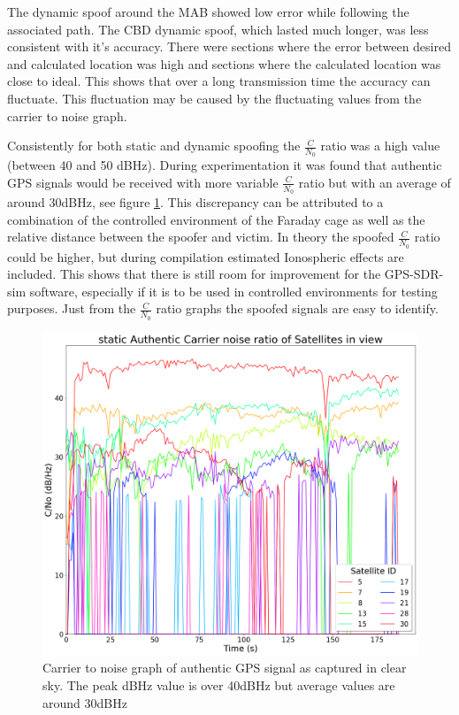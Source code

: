 The dynamic spoof around the MAB showed low error while following the associated path. The CBD dynamic spoof, which lasted much longer, was less consistent with it's
accuracy. There were sections where the error between desired and calculated location was high and sections where the calculated location was close to ideal. This shows that over a long
transmission time the accuracy can fluctuate. This fluctuation may be caused by the fluctuating values from the carrier to noise graph.

Consistently for both static and dynamic spoofing the $\frac{C}{N_0}$ ratio was a high value (between 40 and 50 dBHz). During experimentation it was found that authentic
GPS signals would be received with more variable $\frac{C}{N_0}$ ratio but with an average of around 30dBHz, see figure \ref{fig:authenticCNo}. This discrepancy can be attributed to a combination of the
controlled environment of the Faraday cage as well as the relative distance between the spoofer and victim. In theory the spoofed $\frac{C}{N_0}$ ratio could be higher,
but during compilation estimated Ionospheric effects are included. This shows that there is still room for improvement for the GPS-SDR-sim software, especially if it is
to be used in controlled environments for testing purposes. Just from the $\frac{C}{N_0}$ ratio graphs the spoofed signals are easy to identify.

\begin{figure}[!h]
    \begin{centering}
        \includegraphics[width=12cm,keepaspectratio]{Figures/gnss_log_2021_04_04_21_47_09_static_Authentic_bigtext Carrier noise ratio.png}
        \caption{Carrier to noise graph of authentic GPS signal as captured in clear sky. The peak dBHz value is over 40dBHz but average values are around 30dBHz}
        \label{fig:authenticCNo}
    \end{centering}
\end{figure}

